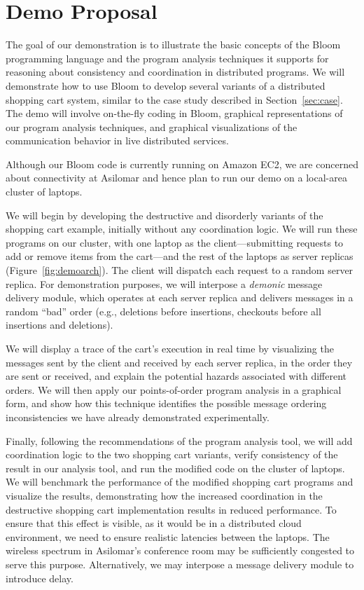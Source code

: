 \clearpage
\section{Demo Proposal}
\label{sec:demo}

The goal of our demonstration
is to illustrate the basic concepts of the Bloom programming language and the
program analysis techniques it supports for reasoning about consistency and
coordination in distributed programs.  We will demonstrate how to use Bloom to
develop several variants of a distributed shopping cart system, similar to the
case study described in Section~\ref{sec:case}.  The demo will involve
on-the-fly coding in Bloom, graphical representations of our program analysis
techniques, and graphical visualizations of the communication behavior in live
distributed services.

Although our Bloom code is currently running on Amazon EC2, we are concerned
about connectivity at Asilomar and hence plan to run our demo on a local-area
cluster of laptops.

We will begin by developing the destructive and disorderly variants of the
shopping cart example, initially without any coordination logic. We will run
these programs on our cluster, with one laptop as the client---submitting
requests to add or remove items from the cart---and the rest of the laptops as
server replicas (Figure~\ref{fig:demoarch}).  The client will dispatch each request to a random server
replica.  For demonstration purposes, we will interpose a \emph{demonic}
message delivery module, which operates at each server replica and delivers
messages in a random ``bad'' order (e.g., deletions before insertions,
checkouts before all insertions and deletions).

We will display a trace of the cart's execution in real time by visualizing the
messages sent by the client and received by each server replica, in the order
they are sent or received, and explain the potential hazards associated with
different orders. We will then apply our points-of-order program analysis in a
graphical form, and show how this technique identifies the possible message
ordering inconsistencies we have already demonstrated experimentally.

Finally, following the recommendations of the program analysis tool, we will
add coordination logic to the two shopping cart variants, verify consistency of
the result in our analysis tool, and run the modified code on the cluster of
laptops. We will benchmark the performance of the modified shopping cart
programs and visualize the results, demonstrating how the increased
coordination in the destructive shopping cart implementation results in reduced
performance. To ensure that this effect is visible, as it would be in a
distributed cloud environment, we need to ensure realistic latencies between
the laptops.  The wireless spectrum in Asilomar's conference room may be
sufficiently congested to serve this purpose.  Alternatively, we may interpose
a message delivery module to introduce delay.

